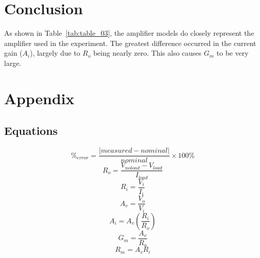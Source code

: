 \documentclass{article}
\begin{document}
\section{Conclusion}
\label{sec:conclusion}

As shown in Table~\ref{tab:table_03}, the amplifier models do closely
represent the amplifier used in the experiment.  The greatest
difference occurred in the current gain ($A_i$), largely due to $R_o$
being nearly zero.  This also causes $G_m$ to be very large.

\section{Appendix}
\label{sec:appendix}

\subsection*{Equations}

\begin{equation}
  \label{eqn:percent_error}
  \%_{error} = \frac{|measured - nominal|}{nominal} \times 100\%
\end{equation}
%
\begin{equation}
  \label{eqn:R_o}
  R_o = \frac{V_{noload} - V_{load}}{I_{load}}
\end{equation}
%
\begin{equation}
  \label{eqn:R_i}
  R_i = \frac{V_i}{I_i}
\end{equation}
%
\begin{equation}
  \label{eqn:A_v}
  A_v = \frac{V_o}{V_i}
\end{equation}
%
\begin{equation}
  \label{eqn:A_i}
  A_i = A_v \left(\frac{R_i}{R_o}\right)
\end{equation}
%
\begin{equation}
  \label{eqn:G_m}
  G_m = \frac{A_v}{R_o}
\end{equation}
%
\begin{equation}
  \label{eqn:R_m}
  R_m = A_v R_i
\end{equation}
\end{document}
